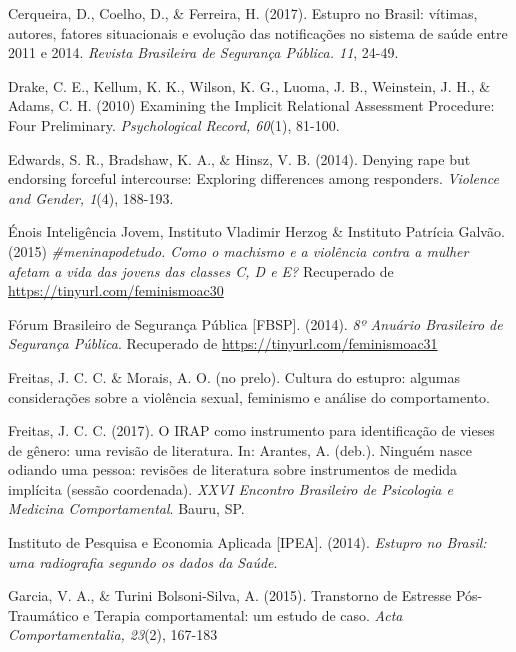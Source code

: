 \hangindent=25pt
\noindent Cerqueira, D., Coelho, D., \& Ferreira, H. (2017). Estupro no Brasil: vítimas, autores, fatores situacionais e evolução das notificações no sistema de saúde entre 2011 e 2014. \textit{Revista Brasileira de Segurança Pública. 11}, 24-49. 

\hangindent=25pt
\noindent Drake, C. E., Kellum, K. K., Wilson, K. G., Luoma, J. B., Weinstein, J. H., \& Adams, C. H. (2010) Examining the Implicit Relational Assessment Procedure: Four Preliminary. \textit{Psychological Record, 60}(1), 81-100.

\hangindent=25pt
\noindent Edwards, S. R., Bradshaw, K. A., \& Hinsz, V. B. (2014). Denying rape but endorsing forceful intercourse: Exploring differences among responders. \textit{Violence and Gender, 1}(4), 188-193.

\hangindent=25pt
\noindent Énois Inteligência Jovem, Instituto Vladimir Herzog \& Instituto Patrícia Galvão. (2015) \textit{\#meninapodetudo. Como o machismo e a violência contra a mulher afetam a vida das jovens das classes C, D e E?} Recuperado de \url{https://tinyurl.com/feminismoac30} 

\hangindent=25pt
\noindent Fórum Brasileiro de Segurança Pública [FBSP]. (2014). \textit{8º Anuário Brasileiro de Segurança Pública}. Recuperado de \url{https://tinyurl.com/feminismoac31}

\hangindent=25pt
\noindent Freitas, J. C. C. \& Morais, A. O. (no prelo). Cultura do estupro: algumas considerações sobre a violência sexual, feminismo e análise do comportamento.

\hangindent=25pt
\noindent Freitas, J. C. C. (2017). O IRAP como instrumento para identificação de vieses de gênero: uma revisão de literatura. In: Arantes, A. (deb.). Ninguém nasce odiando uma pessoa: revisões de literatura sobre instrumentos de medida implícita (sessão coordenada). \textit{XXVI Encontro Brasileiro de Psicologia e Medicina Comportamental}. Bauru, SP.

\hangindent=25pt
\noindent Instituto de Pesquisa e Economia Aplicada [IPEA]. (2014). \textit{Estupro no Brasil: uma radiografia segundo os dados da Saúde}.

\hangindent=25pt
\noindent Garcia, V. A., \& Turini Bolsoni-Silva, A. (2015). Transtorno de Estresse Pós-Traumático e Terapia comportamental: um estudo de caso. \textit{Acta Comportamentalia, 23}(2), 167-183


